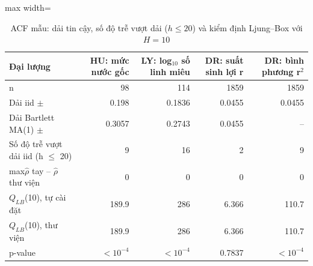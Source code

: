 \begin{table}[H]
\centering\footnotesize
\caption{ACF mẫu: dải tin cậy, số độ trễ vượt dải ($h\le20$) và kiểm định Ljung–Box với $H=10$}\label{tab:tab_b11_04_acf_ljungbox}
\begin{adjustbox}{max width=\linewidth}
\begin{tabular}{|l|r|r|r|r|}
\toprule
Đại lượng & HU: mức nước gốc & LY: log$_{10}$ số linh miêu & DR: suất sinh lợi r & DR: bình phương r$^{2}$ \\
\midrule
n & 98 & 114 & 1859 & 1859 \\
Dải iid $\pm$ & 0.198 & 0.1836 & 0.0455 & 0.0455 \\
Dải Bartlett MA(1) $\pm$ & 0.3057 & 0.2743 & 0.0455 & – \\
Số độ trễ vượt dải iid (h $\le$ 20) & 9 & 16 & 2 & 9 \\
max\textbar{}$\hat{\rho}$ tay – $\hat{\rho}$ thư viện\textbar{} & 0 & 0 & 0 & 0 \\
$Q_{LB}$(10), tự cài đặt & 189.9 & 286 & 6.366 & 110.7 \\
$Q_{LB}$(10), thư viện & 189.9 & 286 & 6.366 & 110.7 \\
p-value & $<10^{-4}$ & $<10^{-4}$ & 0.7837 & $<10^{-4}$ \\
\bottomrule
\end{tabular}
\end{adjustbox}\par{}
\end{table}
